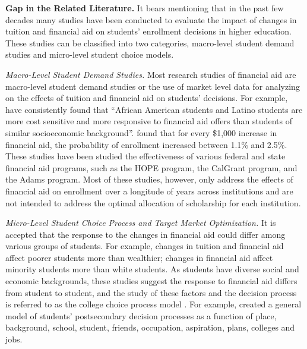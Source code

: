 \documentclass[12pt,english]{report}
\begin{document}

\vspace{0.15in}
\noindent \textbf{Gap in the Related Literature.} 
It bears mentioning that in the past few decades many studies have been conducted to evaluate the impact of changes in tuition and financial aid on students' enrollment decisions in higher education. These studies can be classified into two categories, macro-level student demand studies and micro-level student choice models. 

\vspace{0.1in}
\noindent \textit{Macro-Level Student Demand Studies.} 
Most research studies of financial aid are  macro-level student demand studies 
or the use of market level data for analyzing on the effects of tuition and 
financial aid on students' decisions.  For example, \citet{Hossler1989} have 
consistently found that ``African American students and Latino students are 
more cost sensitive and more responsive to financial aid offers than
students of similar socioeconomic background''.  \citet{Braunstein1999} found 
that for every \$1,000 increase in financial aid, the probability  of  
enrollment increased between 1.1\% and 2.5\%.  These studies have been studied the 
effectiveness of various federal and state financial aid programs, 
such as the HOPE program, the CalGrant program, and the Adams program.  Most 
of these studies, however, only address the effects of financial aid on enrollment 
over a longitude of years across institutions and are not intended to address 
the optimal  allocation of scholarship for each institution. 

\vspace{0.1in}
\noindent \textit{Micro-Level Student Choice Process and Target Market Optimization.} 
It is accepted that the response to the changes in financial aid could 
differ among various groups of students. For example, changes in tuition 
and financial aid affect poorer students more than wealthier; changes in 
financial aid affect minority students more than 
white students. As students have diverse social and economic backgrounds, 
these studies suggest the response to financial aid differs from student 
to student, and the study of these factors and the decision process is 
referred  to as the college choice process model \citep{Paulsen1990}. For 
example, \citet{Jackson1978} created a general model of students' 
postsecondary decision processes as a function of place, background, 
school, student, friends, occupation, aspiration, plans, colleges and 
jobs.
\end{document}
